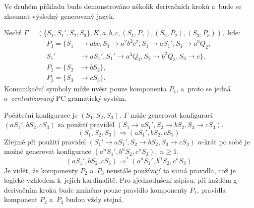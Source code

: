 Ve druhém příkladu bude demonstrováno několik derivačních kroků a~bude se zkoumat výsledný generovaný jazyk.
\begin{example}
    Nechť $\Gamma = (\{S_1, S_1', S_2, S_3\}, K, {a, b, c}, (S_1, P_1), (S_2, P_2), (S_3, P_3)),$ kde:
    \begin{align*}
        P_1 = \{S_1 &\rightarrow abc, S_1 \rightarrow a^2b^2c^2, S_1 \rightarrow aS_1', S_1 \rightarrow a^3Q_2, \\
                S_1' &\rightarrow aS_1', S_1' \rightarrow a^3Q_2, S_2 \rightarrow b^2Q_3, S_3 \rightarrow c\}, \\        
        P_2 = \{S_2 &\rightarrow bS_2\}, \\
        P_3 = \{S_3 &\rightarrow cS_3\}.
    \end{align*}
    Komunikační symboly může uvést pouze komponenta $P_1$, a~proto se jedná o~\emph{centralizovaný} PC gramatický systém.

    Počáteční konfigurace je $(S_1, S_2, S_3)$.
    $\Gamma$ může generovat konfiguraci $(aS_1', bS_2, cS_3)$ za použití pravidel $(S_1 \rightarrow aS_1', S_2 \rightarrow bS_2, S_3 \rightarrow cS_3)$.
    \begin{equation*}
        (S_1, S_2, S_3) \Rightarrow (aS_1', bS_2, cS_3)
    \end{equation*}
    Zřejmě při použití pravidel $(S_1' \rightarrow aS_1', S_2 \rightarrow bS_2, S_3 \rightarrow cS_3)$ $n$-krát po sobě je možné generovat konfigurace $(a^nS_1', b^nS_2, c^nS_3),\;n \geq 1$.
    \begin{equation*}
        (aS_1', bS_2, cS_3) \Rightarrow^* (a^nS_1', b^nS_2, c^nS_3)
    \end{equation*}
    Je vidět, že komponenty $P_2$ a~$P_3$ neustále používají ta samá pravidla, což je logické vzhledem k~jejich kardinalitě.
    Pro zjednodušení zápisu, při každém g-derivačním kroku bude zmíněno pouze pravidlo komponenty $P_1$, pravidla komponent $P_2$ a~$P_3$ budou vždy stejná.


\end{example}
